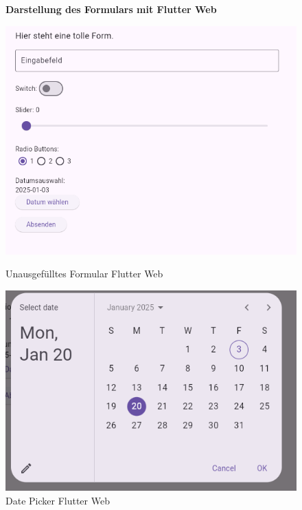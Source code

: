 \begin{figure}[H]
    \centering
    \textbf{Darstellung des Formulars mit Flutter Web}\par\vspace{0.5cm}
    \begin{minipage}{0.45\textwidth}
        \centering
        \includegraphics[width=\linewidth]{images/form/web/flutter/form.png}
        \caption{Unausgefülltes Formular Flutter Web}
    \end{minipage}
    \hfill
    \begin{minipage}{0.45\textwidth}
        \centering
        \includegraphics[width=\linewidth]{images/form/web/flutter/dateOpen.png}
        \caption{Date Picker Flutter Web}
    \end{minipage}


\end{figure}

